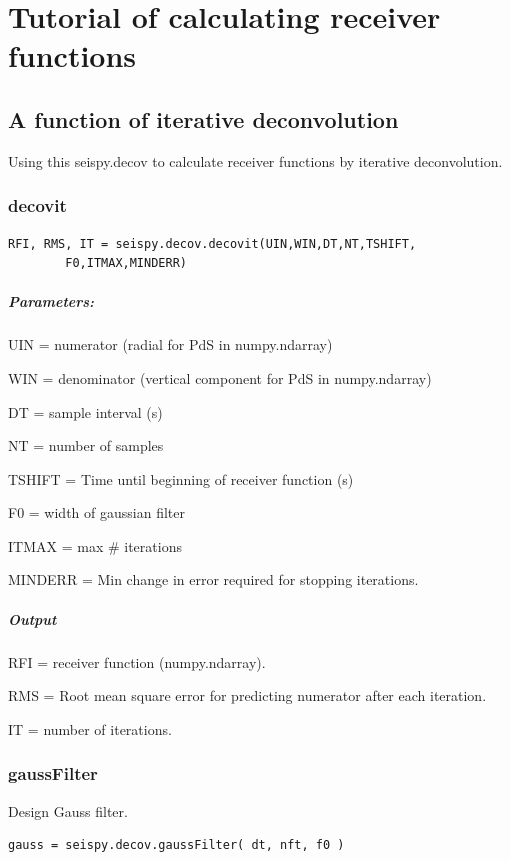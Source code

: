 \documentclass[12pt, a4paper]{report}
\begin{document}
\chapter{Tutorial of calculating receiver functions}
\section{A function of iterative deconvolution}
Using this {\C seispy.decov} to calculate receiver functions by iterative deconvolution.
\subsection{decovit}
\begin{lstlisting}
RFI, RMS, IT = seispy.decov.decovit(UIN,WIN,DT,NT,TSHIFT,
		F0,ITMAX,MINDERR)
\end{lstlisting}
\paragraph{\tb Parameters:}
\begin{description}
\item UIN = numerator (radial for PdS in {\C numpy.ndarray})
\item WIN = denominator (vertical component for PdS in {\C numpy.ndarray})
\item DT = sample interval (s)
\item NT = number of samples
\item TSHIFT = Time until beginning of receiver function (s)
\item F0 = width of gaussian filter
\item ITMAX = max \# iterations
\item MINDERR = Min change in error required for stopping iterations.
\end{description}
\paragraph{Output}
\begin{description}
\item RFI = receiver function ({\C numpy.ndarray}).
\item RMS = Root mean square error for predicting numerator after each iteration.
\item IT = number of iterations.
\end{description}

\subsection{gaussFilter}
Design Gauss filter.
\begin{lstlisting}
gauss = seispy.decov.gaussFilter( dt, nft, f0 )
\end{lstlisting}
\end{document}
